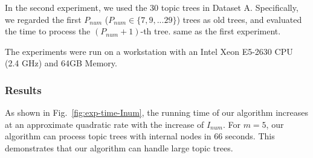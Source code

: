 


In the second experiment, we used the 30 topic trees in Dataset A.
Specifically, we regarded the first $P_{num}$ ($P_{num}\in \{7,9,...29\}$) trees as old trees, and evaluated the time to process the $(P_{num}+1)$-th tree.
 same as the first experiment.



The experiments were run on a workstation with an Intel Xeon E5-2630 CPU (2.4 GHz) and 64GB Memory.


\subsubsection{Results}

As shown in Fig.~\ref{fig:exp-time-Inum}, the running time of our algorithm increases at an approximate quadratic rate with the increase of $I_{num}$.
For $m=5$, our algorithm can process topic trees with  internal nodes in 66 seconds.
This demonstrates that our algorithm can handle large topic trees.


